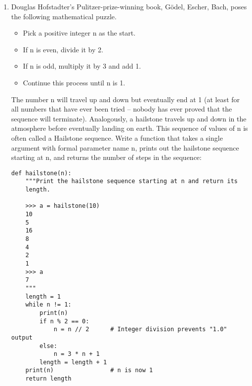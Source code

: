 \documentclass[twoside]{article}
\begin{document}
\begin{enumerate}
\begin{enumerate}
\begin{lstlisting}
\end{lstlisting}
\end{enumerate}

\vspace{0.2in}




\begin{enumerate}
\item Douglas Hofstadter's Pulitzer-prize-winning book, Gödel, Escher, Bach, poses the following mathematical puzzle.

\begin{itemize}
\item Pick a positive integer n as the start.
\item If n is even, divide it by 2.
\item If n is odd, multiply it by 3 and add 1.
\item Continue this process until n is 1.
\end{itemize}
The number n will travel up and down but eventually end at 1 (at least for all numbers that have ever been tried -- nobody has ever proved that the sequence will terminate). Analogously, a hailstone travels up and down in the atmosphere before eventually landing on earth. This sequence of values of n is often called a Hailstone sequence. Write a function that takes a single argument with formal parameter name n, prints out the hailstone sequence starting at n, and returns the number of steps in the sequence:

\begin{lstlisting}
def hailstone(n):
    """Print the hailstone sequence starting at n and return its
    length.

    >>> a = hailstone(10)
    10
    5
    16
    8
    4
    2
    1
    >>> a
    7
    """
    length = 1
    while n != 1:
        print(n)
        if n % 2 == 0:
            n = n // 2      # Integer division prevents "1.0" output
        else:
            n = 3 * n + 1
        length = length + 1
    print(n)                # n is now 1
    return length
\end{lstlisting}
\end{enumerate}


\end{enumerate}
\end{document}
